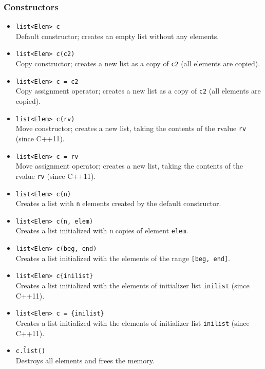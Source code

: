 \documentclass{report}
\begin{document}
\subsubsection{Constructors}
\bigbreak \noindent 
\begin{itemize}
    \item \texttt{list<Elem> c} \\
        Default constructor; creates an empty list without any elements.
    \item \texttt{list<Elem> c(c2)} \\
        Copy constructor; creates a new list as a copy of \texttt{c2} (all elements are copied).
    \item \texttt{list<Elem> c = c2} \\
        Copy assignment operator; creates a new list as a copy of \texttt{c2} (all elements are copied).
    \item \texttt{list<Elem> c(rv)} \\
        Move constructor; creates a new list, taking the contents of the rvalue \texttt{rv} (since C++11).
    \item \texttt{list<Elem> c = rv} \\
        Move assignment operator; creates a new list, taking the contents of the rvalue \texttt{rv} (since C++11).
    \item \texttt{list<Elem> c(n)} \\
        Creates a list with \texttt{n} elements created by the default constructor.
    \item \texttt{list<Elem> c(n, elem)} \\
        Creates a list initialized with \texttt{n} copies of element \texttt{elem}.
    \item \texttt{list<Elem> c(beg, end)} \\
        Creates a list initialized with the elements of the range \texttt{[beg, end]}.
    \item \texttt{list<Elem> c\{inilist\}} \\
        Creates a list initialized with the elements of initializer list \texttt{inilist} (since C++11).
    \item \texttt{list<Elem> c = \{inilist\}} \\
        Creates a list initialized with the elements of initializer list \texttt{inilist} (since C++11).
    \item \texttt{c.\~list()} \\
        Destroys all elements and frees the memory.
\end{itemize}
\end{document}
